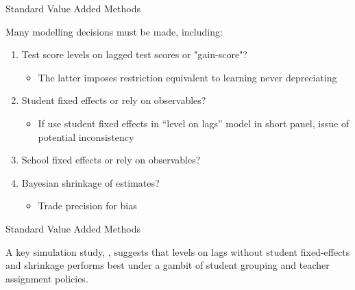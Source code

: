 \documentclass[11pt]{beamer}
\begin{document}
\begin{frame}{Standard Value Added Methods}

Many modelling decisions must be made, including:

    \begin{enumerate}
        \item Test score levels on lagged test scores or "gain-score"? 
            \begin{itemize}
                \item The latter imposes restriction equivalent to learning never depreciating
            \end{itemize}
        \item<2-> Student fixed effects or rely on observables?
            \begin{itemize}
                \item<2-> If use student fixed effects in ``level on lags” model in short panel, issue of potential inconsistency %
            \end{itemize}
        \item<3-> School fixed effects or rely on observables?
        \item<4-> Bayesian shrinkage of estimates?
            \begin{itemize}
                \item<4> Trade precision for bias
            \end{itemize}
    \end{enumerate}


\end{frame}



\begin{frame}{Standard Value Added Methods}

    A key simulation study, \cite{guarino2015can}, suggests that levels on lags without student fixed-effects and shrinkage performs best under a gambit of student grouping and teacher assignment policies.

\end{frame}


\end{document}

